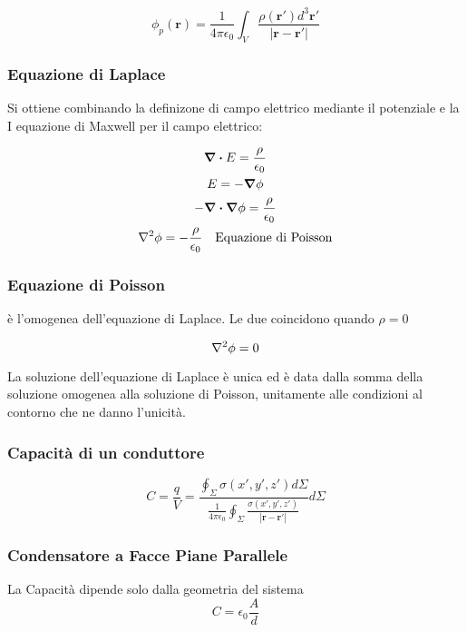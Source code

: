 \documentclass[a4paper]{scrarticle}
\begin{document}
\begin{equation}
    \phi_p(\bm r) = \frac{1}{4\pi\epsilon_0}\int_{V}\frac{\rho(\bm r') d^3\bm r'}{\left|\bm r - \bm r'\right|}
\end{equation}


\subsubsection*{Equazione di Laplace}

Si ottiene combinando la definizone di campo elettrico mediante il potenziale e la I equazione di Maxwell per il campo elettrico:

\begin{gather*}
    \div E = \frac{\rho}{\epsilon_0}\\
    E = - \grad \phi\\
    - \div \grad \phi = \frac{\rho}{\epsilon_0}\\
    \laplacian \phi = -\frac{\rho}{\epsilon_0} \quad \text{Equazione di Poisson}
\end{gather*}

\subsubsection*{Equazione di Poisson}

è l'omogenea dell'equazione di Laplace. Le due coincidono quando $\rho = 0$

\begin{equation}
    \laplacian \phi = 0
\end{equation}

La soluzione dell'equazione di Laplace è unica ed è data dalla somma della soluzione omogenea alla soluzione di Poisson, unitamente alle condizioni al contorno che ne danno l'unicità.

\subsubsection*{Capacità di un conduttore}

\begin{equation}
    C = \frac{q}{V} = 
    \frac{\oint_\Sigma \sigma (x',y',z') d\Sigma}{\frac{1}{4\pi\epsilon_0} \oint_\Sigma \frac{\sigma(x',y',z')}{\left| \bm{r} - \bm{r'} \right|}} d\Sigma
\end{equation}

\subsubsection*{Condensatore a Facce Piane Parallele}
La Capacità dipende solo dalla geometria del sistema
\begin{equation*}
    C = \epsilon_0 \frac{A}{d}
\end{equation*}
\end{document}
